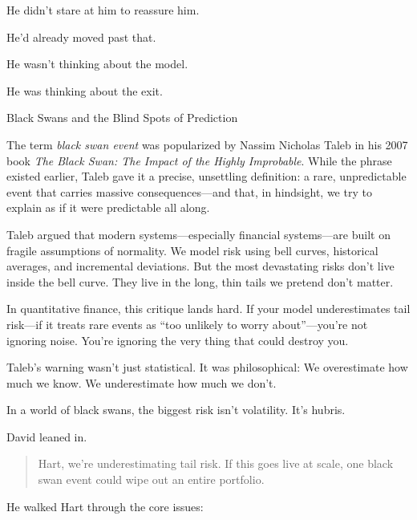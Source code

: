 He didn't stare at him to reassure him. 

He’d already moved past that.

He wasn’t thinking about the model.

He was thinking about the exit.


\medskip

\begin{HistoricalSidebar}{Black Swans and the Blind Spots of Prediction}

  The term \textit{black swan event} was popularized by Nassim Nicholas Taleb in his 2007 book \textit{The Black Swan: 
  The Impact of the Highly Improbable}. While the phrase existed earlier, Taleb gave it a precise, unsettling definition: 
  a rare, unpredictable event that carries massive consequences—and that, in hindsight, we try to explain as if it 
  were predictable all along.

  \medskip
  
  Taleb argued that modern systems—especially financial systems—are built on fragile assumptions of normality. We model 
  risk using bell curves, historical averages, and incremental deviations. But the most devastating risks don’t live 
  inside the bell curve. They live in the long, thin tails we pretend don’t matter.
  
  \medskip
  
  In quantitative finance, this critique lands hard. If your model underestimates tail risk—if it treats rare events 
  as “too unlikely to worry about”—you’re not ignoring noise. You’re ignoring the very thing that could destroy you.

  \medskip
  
  Taleb’s warning wasn’t just statistical. It was philosophical:  
  We overestimate how much we know.  
  We underestimate how much we don’t.

  \medskip
  
  In a world of black swans, the biggest risk isn’t volatility.  
  It’s hubris.
  
\end{HistoricalSidebar}

\medskip

David leaned in.

\begin{quote}
Hart, we’re underestimating tail risk. If this goes live at scale, one black swan event could wipe out an 
entire portfolio.
\end{quote}

He walked Hart through the core issues:

